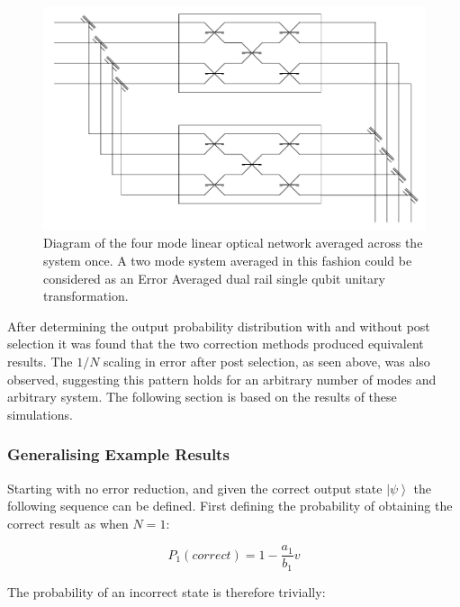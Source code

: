 \documentclass[aps,pra,twocolumn,superscriptaddress,numerical]{revtex4-1}
\begin{document}
		
		\begin{figure}[h]
			\begin{centering}
				\includegraphics[width=\columnwidth]{4_mode_average_across.jpg}
				\par\end{centering}
			
			\caption{Diagram of the four mode linear optical network averaged across the system once. A two mode system averaged in this fashion could be considered as an Error Averaged dual rail single qubit unitary transformation. \label{fig: averaging 4 mode diagram}}
		\end{figure}
		
		
		After determining the output probability distribution with and without post selection it was found that the two correction methods produced equivalent results. The $1/N$ scaling in error after post selection, as seen above, was also observed, suggesting this pattern holds for an arbitrary number of modes and arbitrary system. The following section is based on the results of these simulations.
		
	\subsubsection{Generalising Example Results}
		
		Starting with no error reduction, and given the correct output state $\left|\psi\right\rangle $ the following sequence can be defined. First defining the probability of obtaining the correct result as when $N=1$:
			
		\begin{equation}
			P_{1}(correct)=1-\frac{a_{1}}{b_{1}}v
		\end{equation}
			
		The probability of an incorrect state is therefore trivially:
			
\end{document}

